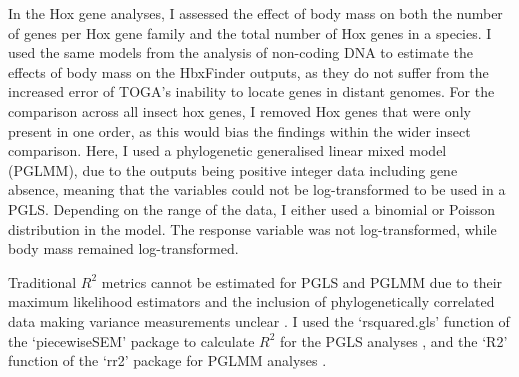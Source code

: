 \documentclass[11pt]{article}
\begin{document}
In the Hox gene analyses, I assessed the effect of body mass on both the number of genes per Hox gene family and the total number of Hox genes in a species. I used the same models from the analysis of non-coding DNA to estimate the effects of body mass on the HbxFinder outputs, as they do not suffer from the increased error of TOGA's inability to locate genes in distant genomes. For the comparison across all insect hox genes, I removed Hox genes that were only present in one order, as this would bias the findings within the wider insect comparison. Here, I used a phylogenetic generalised linear mixed model (PGLMM), due to the outputs being positive integer data including gene absence, meaning that the variables could not be log-transformed to be used in a PGLS. Depending on the range of the data, I either used a binomial or Poisson distribution in the model. The response variable was not log-transformed, while body mass remained log-transformed. 

Traditional $R^2$ metrics cannot be estimated for PGLS and PGLMM due to their maximum likelihood estimators and the inclusion of phylogenetically correlated data making variance measurements unclear \citep{rr2}.  I used the `rsquared.gls' function of the `piecewiseSEM' package to calculate $R^2$ for the PGLS analyses \citep{piecewiseSEM}, and the `R2' function of the `rr2' package for PGLMM analyses \citep{rr2}.
\end{document}
